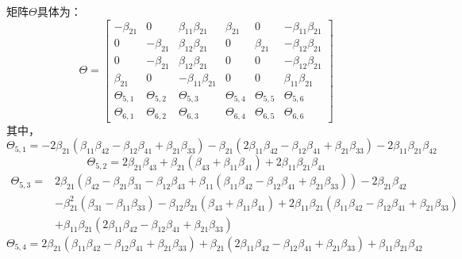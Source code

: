 \documentclass{article}
\begin{document}
\par
矩阵$\Theta$具体为：
\begin{equation}
    \Theta=\left[\begin{array}{cccccc} 
        -\beta_{21}&0&\beta_{11}\beta_{21}&\beta_{21}&0&-\beta_{11}\beta_{21}\\
        0&-\beta_{21}&\beta_{12}\beta_{21}&0&\beta_{21}&-\beta_{12}\beta_{21}\\
        0&-\beta_{21}&\beta_{12}\beta_{21}&0&0&-\beta_{12}\beta_{21}\\
        \beta_{21}&0&-\beta_{11}\beta_{21}&0&0&\beta_{11}\beta_{21}\\
        \Theta_{5,1}&\Theta_{5,2}&\Theta_{5,3}&\Theta_{5,4}&\Theta_{5,5}&\Theta_{5,6}\\
        \Theta_{6,1}&\Theta_{6,2}&\Theta_{6,3}&\Theta_{6,4}&\Theta_{6,5}&\Theta_{6,6}
    \end{array}\right]
\end{equation}
其中，
\begin{equation}
    \Theta_{5,1}=-2\beta_{21}(\beta_{11}\beta_{42}-\beta_{12}\beta_{41}+\beta_{21}\beta_{33})
    -\beta_{21}(2\beta_{11}\beta_{42}-\beta_{12}\beta_{41}+\beta_{21}\beta_{33})-2\beta_{11}\beta_{21}\beta_{42}
\end{equation}
\begin{equation}
    \Theta_{5,2}=2\beta_{21}\beta_{43}+\beta_{21}(\beta_{43}+\beta_{11}\beta_{41})+2\beta_{11}\beta_{21}\beta_{41}
\end{equation}
\begin{equation}
    \begin{array}{ll}
        \Theta_{5,3}=&2\beta_{21}(\beta_{42}-\beta_{21}\beta_{31}-\beta_{12}\beta_{43}+
        \beta_{11}(\beta_{11}\beta_{42}-\beta_{12}\beta_{41}+\beta_{21}\beta_{33}))-2\beta_{21}\beta_{42}\\
        &-\beta_{21}^{2}(\beta_{31}-\beta_{11}\beta_{33})-\beta_{12}\beta_{21}(\beta_{43}+\beta_{11}\beta_{41})
        +2\beta_{11}\beta_{21}(\beta_{11}\beta_{42}-\beta_{12}\beta_{41}+\beta_{21}\beta_{33})\\
        &+\beta_{11}\beta_{21}(2\beta_{11}\beta_{42}-\beta_{12}\beta_{41}+\beta_{21}\beta_{33})
    \end{array}
\end{equation}
\begin{equation}
    \Theta_{5,4}=2\beta_{21}(\beta_{11}\beta_{42}-\beta_{12}\beta_{41}+\beta_{21}\beta_{33})
    +\beta_{21}(2\beta_{11}\beta_{42}-\beta_{12}\beta_{41}+\beta_{21}\beta_{33})+\beta_{11}\beta_{21}\beta_{42}
\end{equation}
\end{document}
